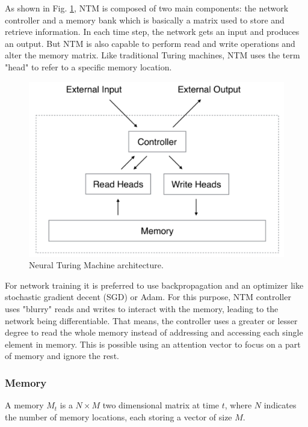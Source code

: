 \documentclass[acmsmall]{acmart}
\begin{document}
As shown in Fig. \ref{fig:ntmarch}, NTM is composed of two main components: the network controller and a memory bank which is basically a matrix used to store and retrieve information. In each time step, the network gets an input and produces an output. But NTM is also capable to perform read and write operations and alter the memory matrix. Like traditional Turing machines, NTM uses the term "head" to refer to a specific memory location.

\begin{figure}[h]
	\centering
	\includegraphics[scale=0.15]{figures/ntmarch}
	\caption{Neural Turing Machine architecture.}
	\label{fig:ntmarch}
\end{figure}

For network training it is preferred to use backpropagation and an optimizer like stochastic gradient decent (SGD) or Adam. For this purpose, NTM controller uses "blurry" reads and writes to interact with the memory, leading to the network being differentiable. That means, the controller uses a greater or lesser degree to read the whole memory instead of addressing and accessing each single element in memory. This is possible using an attention vector to focus on a part of memory and ignore the rest.

\subsubsection{Memory}
A memory $M_{t}$ is a $N \times M$ two dimensional matrix at time $t$, where $N$ indicates the number of memory locations, each storing a vector of size $M$.
\end{document}

